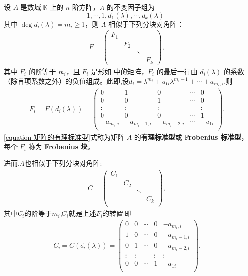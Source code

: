 \documentclass[../../main.tex]{subfiles}
\begin{document}
\begin{theorem}\label{theorem:有理标准型核心定理}
设 $A$ 是数域 $\mathbb{K}$ 上的 $n$ 阶方阵，$A$ 的不变因子组为
\[
1,\cdots,1,d_1(\lambda),\cdots,d_k(\lambda),
\]
其中 $\deg d_i(\lambda)=m_i\geq1$，则 $A$ 相似于下列分块对角阵：
\begin{align}\label{equation-矩阵的有理标准型}
F = \begin{pmatrix}
F_1 & & & \\
& F_2 & & \\
& & \ddots & \\
& & & F_k
\end{pmatrix},
\end{align}
其中 $F_i$ 的阶等于 $m_i$，且 $F_i$ 是形如 中的矩阵，$F_i$ 的最后一行由 $d_i(\lambda)$ 的系数（除首项系数之外）的负值组成。此即,设$d_i=\lambda ^{m_i}+a_{1i}\lambda ^{m_i-1}+\cdots +a_{m_i,i}$,则
\begin{align*}
F_i=F(d_i(\lambda))=\left( \begin{matrix}
0&		1&		0&		\cdots&		0\\
0&		0&		1&		\cdots&		0\\
\vdots&		\vdots&		\vdots&		&		\vdots\\
0&		0&		0&		\cdots&		1\\
-a_{m_i,i}&		-a_{m_i-1,i}&		-a_{m_i-2,i}&		\cdots&		-a_{1i}\\
\end{matrix} \right) .
\end{align*}
\eqref{equation-矩阵的有理标准型}式称为矩阵 $A$ 的\textbf{有理标准型}或 \textbf{Frobenius 标准型}，每个 $F_i$ 称为 \textbf{Frobenius 块}。

进而,$A$也相似于下列分块对角阵:
\begin{align*}
C=\left( \begin{matrix}
C_1&		&		&		\\
&		C_2&		&		\\
&		&		\ddots&		\\
&		&		&		C_k\\
\end{matrix} \right) ,
\end{align*}
其中$C_i$的阶等于$m_i$,$C_i$就是上述$F_i$的转置,即
\begin{align*}
C_i=C(d_i(\lambda ))=\left( \begin{matrix}
0&		0&		\cdots&		0&		-a_{m_i,i}\\
1&		0&		\cdots&		0&		-a_{m_i-1,i}\\
0&		1&		\cdots&		0&		-a_{m_i-2,i}\\
\vdots&		\vdots&		&		\vdots&		\vdots\\
0&		0&		\cdots&		1&		-a_{1i}\\
\end{matrix} \right) .
\end{align*}
\end{theorem}
\end{document}
